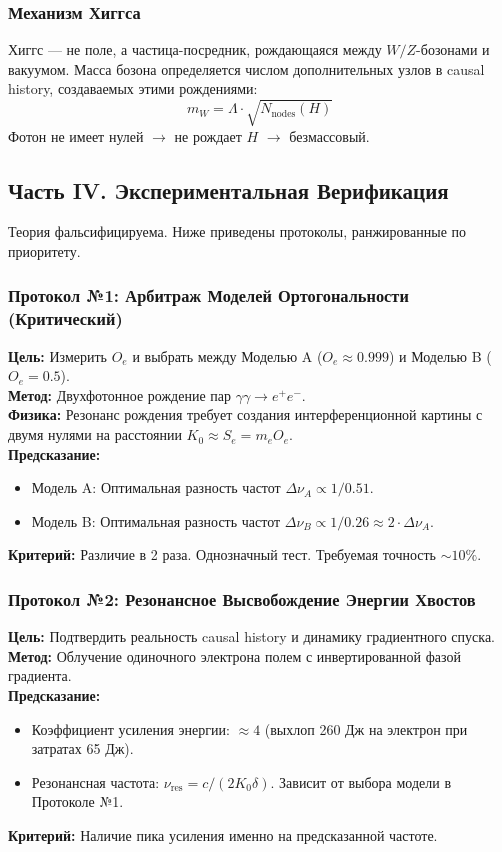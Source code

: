 \documentclass[12pt,a4paper]{article}
\begin{document}
\subsubsection{Механизм Хиггса}
Хиггс — не поле, а частица-посредник, рождающаяся между $W/Z$-бозонами и вакуумом. Масса бозона определяется числом дополнительных узлов в causal history, создаваемых этими рождениями:
\begin{equation}
    m_W = \Lambda \cdot \sqrt{N_{\text{nodes}}(H)}
\end{equation}
Фотон не имеет нулей $\to$ не рождает $H$ $\to$ безмассовый.

\subsection{Часть IV. Экспериментальная Верификация}

Теория фальсифицируема. Ниже приведены протоколы, ранжированные по приоритету.

\subsubsection{Протокол №1: Арбитраж Моделей Ортогональности (Критический)}
\textbf{Цель:} Измерить $O_e$ и выбрать между Моделью A ($O_e \approx 0.999$) и Моделью B ($O_e = 0.5$).\\
\textbf{Метод:} Двухфотонное рождение пар $\gamma\gamma \to e^+e^-$.\\
\textbf{Физика:} Резонанс рождения требует создания интерференционной картины с двумя нулями на расстоянии $K_0 \approx S_e = m_e O_e$.\\
\textbf{Предсказание:}
\begin{itemize}
    \item Модель A: Оптимальная разность частот $\Delta \nu_A \propto 1/0.51$.
    \item Модель B: Оптимальная разность частот $\Delta \nu_B \propto 1/0.26 \approx 2 \cdot \Delta \nu_A$.
\end{itemize}
\textbf{Критерий:} Различие в 2 раза. Однозначный тест. Требуемая точность $\sim 10\%$.

\subsubsection{Протокол №2: Резонансное Высвобождение Энергии Хвостов}
\textbf{Цель:} Подтвердить реальность causal history и динамику градиентного спуска.\\
\textbf{Метод:} Облучение одиночного электрона полем с инвертированной фазой градиента.\\
\textbf{Предсказание:}
\begin{itemize}
    \item Коэффициент усиления энергии: $\approx 4$ (выхлоп 260 Дж на электрон при затратах 65 Дж).
    \item Резонансная частота: $\nu_{\text{res}} = c / (2 K_0 \delta)$. Зависит от выбора модели в Протоколе №1.
\end{itemize}
\textbf{Критерий:} Наличие пика усиления именно на предсказанной частоте.
\end{document}
